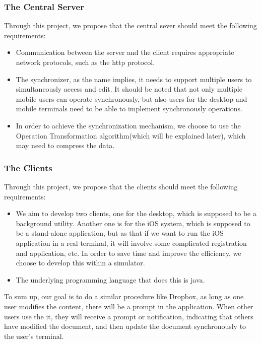 \subsubsection{The Central Server}
\noindent Through this project, we propose that the central sever should meet the following requirements:

\begin{itemize}
    \item Communication between the server and the client requires appropriate network protocols, such as the http protocol.
    \item The synchronizer, as the name implies, it needs to support multiple users to simultaneously access and edit. It should be noted that not only multiple mobile users can operate synchronously, but also users for the desktop and mobile terminals need to be able to implement synchronously operations.
    \item In order to achieve the synchronization mechanism, we choose to use the Operation Transformation algorithm(which will be explained later), which may need to compress the data.
\end{itemize}


\subsubsection{The Clients}
\noindent Through this project, we propose that the clients should meet the following requirements:

\begin{itemize}
    \item We aim to develop two clients, one for the desktop, which is supposed to be a background utility. Another one is for the iOS system, which is supposed to be a stand-alone application, but as that if we want to run the iOS application in a real terminal, it will involve some complicated registration and application, etc. In order to save time and improve the efficiency, we choose to develop this within a simulator.
    \item The underlying programming language that does this is java.

 
\end{itemize}

    
 \noindent To sum up, our goal is to do a similar procedure like Dropbox, as long as one user modifies the content, there will be a prompt in the application. When other users use the it, they will receive a prompt or notification, indicating that others have modified the document, and then update the document synchronously to the user's terminal.






